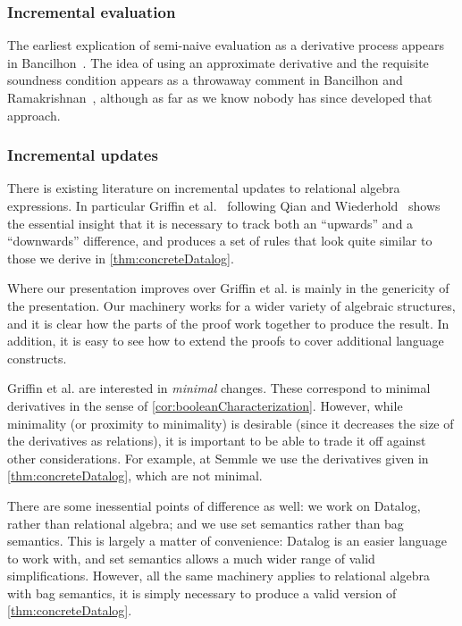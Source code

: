 \subsubsection{Incremental evaluation}

The earliest explication of semi-naive evaluation as a derivative process
appears in Bancilhon~\cite{bancilhon1986naive}. The idea of using an approximate derivative
and the requisite soundness condition appears as a throwaway comment in
Bancilhon and Ramakrishnan~\cite{bancilhon1986amateur}, although as far as we know nobody has since
developed that approach. 

\subsubsection{Incremental updates}

There is existing literature on incremental updates to relational algebra
expressions. In particular Griffin et al.~\cite{griffin1997improved} following
Qian and Wiederhold~\cite{qian1991incremental} shows the essential insight that it is necessary to
track both an ``upwards'' and a ``downwards'' difference, and produces a set of
rules that look quite similar to those we derive in \ref{thm:concreteDatalog}.

Where our presentation improves over Griffin et al. is mainly in
the genericity of the presentation. Our machinery works for a wider variety of
algebraic structures, and it is clear how the parts of the proof work together
to produce the result. In addition, it is easy to see how to extend the proofs
to cover additional language constructs.

Griffin et al. are interested in \emph{minimal} changes. These correspond to
minimal derivatives in the sense of \ref{cor:booleanCharacterization}. However,
while minimality (or proximity to minimality) is desirable (since it decreases
the size of the derivatives as relations), it is important to be able to trade
it off against other considerations. For example, at
Semmle we use the derivatives given in \ref{thm:concreteDatalog}, which are not minimal.

There are some inessential points of difference as well: we work on Datalog,
rather than relational algebra; and we use set semantics rather than bag
semantics. This is largely a matter of convenience: Datalog is an easier
language to work with, and set semantics allows a much wider range of valid
simplifications. However, all the same machinery applies to relational algebra
with bag semantics, it is simply necessary to produce a valid version of \ref{thm:concreteDatalog}.

